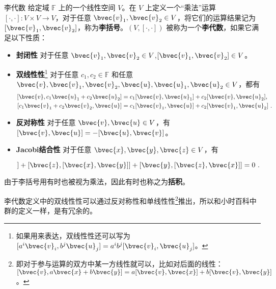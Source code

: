 \begin{definition}{李代数}\label{def_LieAlg_2}
给定域 $\mathbb{F}$ 上的一个线性空间 $V$。在 $V$ 上定义一个“乘法”运算 $[\cdot, \cdot] : V \times V \to V$，对于任意 $\bvec{v}_1, \bvec{v}_2\in V$，将它们的运算结果记为 $[\bvec{v}_1, \bvec{v}_2]$，称为\textbf{李括号}。$(V, [\cdot, \cdot])$ 被称为一个\textbf{李代数}，如果它满足以下性质：

\begin{itemize}
\item \textbf{封闭性} 对于任意 $\bvec{v}_1, \bvec{v}_2\in V$,$[\bvec{v}_1, \bvec{v}_2]\in V$。%

\item \textbf{双线性性}\footnote{如果用来表达，双线性性还可以写为 $[a^i\bvec{v}_i, b^j\bvec{u}_j] = a^i b^j[\bvec{v}_i, \bvec{u}_j]$。} 对于任意 $c_1, c_2 \in \mathbb{F}$ 和任意 $\bvec{v}, \bvec{v}_1, \bvec{v}_2, \bvec{u}, \bvec{u}_1, \bvec{u}_2 \in V$，都有 
\begin{equation}
\begin{aligned}
{[\bvec{v}, c_1\bvec{u}_1 + c_2\bvec{u}_2]} &= c_1 [\bvec{v}, \bvec{u}_1] + c_2[\bvec{v}, \bvec{u}_2], \\
[c_1\bvec{v}_1+c_2\bvec{v}_2, \bvec{u}] &= c_1[\bvec{v}_1, \bvec{u}] + c_2[\bvec{v}_1, \bvec{u}_2]~.
\end{aligned}
\end{equation}

\item \textbf{反对称性} 对于任意 $\bvec{v}, \bvec{u}\in V$，有 $[\bvec{v}, \bvec{u}]=-[\bvec{u}, \bvec{v}]$。

\item \textbf{Jacobi结合性} 对于任意 $\bvec{x}, \bvec{y}, \bvec{z}\in V$，有

\begin{equation}
[\bvec{x}, [\bvec{y}, \bvec{z}]]+[\bvec{z}, [\bvec{x}, \bvec{y}]]+[\bvec{y}, [\bvec{z}, \bvec{x}]]=0~.
\end{equation}

\end{itemize}

由于李括号用有时也被视为乘法，因此有时也称之为\textbf{括积}。
\end{definition}


李代数定义中的双线性性可以通过反对称性和单线性性\footnote{即对于参与运算的双方中某一方线性就可以，比如对后面的线性：$[\bvec{v},a\bvec{x}+b\bvec{y}]=a[\bvec{v}, \bvec{x}]+b[\bvec{v}, \bvec{y}]$。}推出，所以和小时百科中群的定义一样，是有冗余的。

